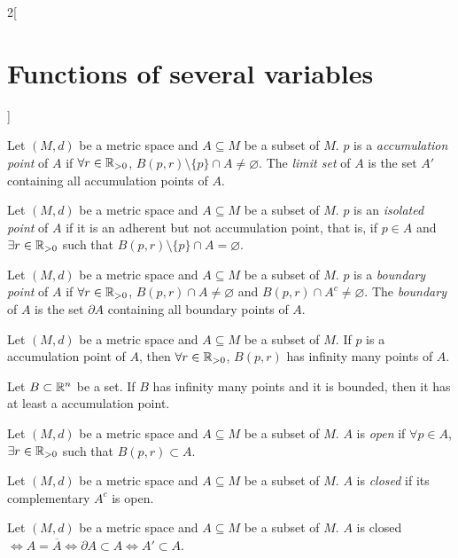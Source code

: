 \documentclass[../../../main.tex]{subfiles}
\begin{document}
\begin{multicols}{2}[\section{Functions of several variables}]
\begin{definition}
  \end{definition}
  \begin{definition}
    Let $(M,d)$ be a metric space and $A\subseteq M$ be a subset of $M$. $p$ is a \textit{accumulation point} of $A$ if $\forall r\in\mathbb{R}_{>0}$, $B(p,r)\setminus\{p\}\cap A\ne\varnothing$. The \textit{limit set} of $A$ is the set $A'$ containing all accumulation points of $A$.
  \end{definition}
  \begin{definition}
    Let $(M,d)$ be a metric space and $A\subseteq M$ be a subset of $M$. $p$ is an \textit{isolated point} of $A$ if it is an adherent but not accumulation point, that is, if $p\in A$ and $\exists r\in\mathbb{R}_{>0}$ such that $B(p,r)\setminus\{p\}\cap A=\varnothing$.
  \end{definition}
  \begin{definition}
    Let $(M,d)$ be a metric space and $A\subseteq M$ be a subset of $M$. $p$ is a \textit{boundary point} of $A$ if $\forall r\in\mathbb{R}_{>0}$, $B(p,r)\cap A\ne\varnothing$ and $B(p,r)\cap A^c\ne\varnothing$. The \textit{boundary} of $A$ is the set $\partial A$ containing all boundary points of $A$.
  \end{definition}
  \begin{prop}
    Let $(M,d)$ be a metric space and $A\subseteq M$ be a subset of $M$. If $p$ is a accumulation point of $A$, then $\forall r\in\mathbb{R}_{>0}$, $B(p,r)$ has infinity many points of $A$.
  \end{prop}
  \begin{theorem}
    Let $B\subset\mathbb{R}^n$ be a set. If $B$ has infinity many points and it is bounded, then it has at least a accumulation point.
  \end{theorem}
  \begin{definition}
    Let $(M,d)$ be a metric space and $A\subseteq M$ be a subset of $M$. $A$ is \textit{open} if $\forall p\in A$, $\exists r\in\mathbb{R}_{>0}$ such that $B(p,r)\subset A$.
  \end{definition}
  \begin{definition}
    Let $(M,d)$ be a metric space and $A\subseteq M$ be a subset of $M$. $A$ is \textit{closed} if its complementary $A^c$ is open.
  \end{definition}
  \begin{prop}
    Let $(M,d)$ be a metric space and $A\subseteq M$ be a subset of $M$. $A$ is closed $\iff A=\overline{A}\iff\partial A\subset A\iff A'\subset A$.
  \end{prop}

\end{multicols}
\end{document}
